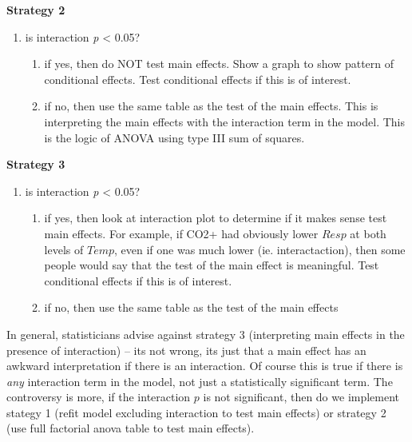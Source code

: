 \documentclass[]{book}
\providecommand{\tightlist}{%
  \setlength{\itemsep}{0pt}\setlength{\parskip}{0pt}}
\begin{document}
\textbf{Strategy 2}

\begin{enumerate}
\def\labelenumi{\arabic{enumi}.}
\setcounter{enumi}{1}
\tightlist
\item
  is interaction \emph{p} \textless{} 0.05?

  \begin{enumerate}
  \def\labelenumii{\alph{enumii}.}
  \tightlist
  \item
    if yes, then do NOT test main effects. Show a graph to show pattern
    of conditional effects. Test conditional effects if this is of
    interest.
  \item
    if no, then use the same table as the test of the main effects. This
    is interpreting the main effects with the interaction term in the
    model. This is the logic of ANOVA using type III sum of squares.
  \end{enumerate}
\end{enumerate}

\textbf{Strategy 3}

\begin{enumerate}
\def\labelenumi{\arabic{enumi}.}
\setcounter{enumi}{2}
\tightlist
\item
  is interaction \emph{p} \textless{} 0.05?

  \begin{enumerate}
  \def\labelenumii{\alph{enumii}.}
  \tightlist
  \item
    if yes, then look at interaction plot to determine if it makes sense
    test main effects. For example, if CO2+ had obviously lower \(Resp\)
    at both levels of \(Temp\), even if one was much lower (ie.
    interactaction), then some people would say that the test of the
    main effect is meaningful. Test conditional effects if this is of
    interest.
  \item
    if no, then use the same table as the test of the main effects
  \end{enumerate}
\end{enumerate}

In general, statisticians advise against strategy 3 (interpreting main
effects in the presence of interaction) -- its not wrong, its just that
a main effect has an awkward interpretation if there is an interaction.
Of course this is true if there is \emph{any} interaction term in the
model, not just a statistically significant term. The controversy is
more, if the interaction \(p\) is not significant, then do we implement
stategy 1 (refit model excluding interaction to test main effects) or
strategy 2 (use full factorial anova table to test main effects).
\end{document}
